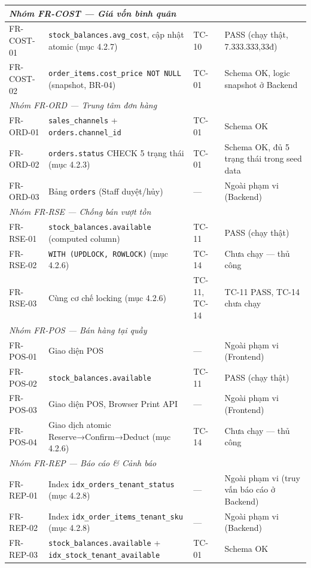 \begin{longtable}{|p{2.1cm}|p{5.2cm}|p{3.3cm}|p{2.6cm}|}
\multicolumn{4}{|l|}{\textit{Nhóm FR-COST — Giá vốn bình quân}} \\ \hline
FR-COST-01 & \texttt{stock\_balances.avg\_cost}, cập nhật atomic (mục 4.2.7) & TC-10 & PASS (chạy thật, 7.333.333,33đ) \\ \hline
FR-COST-02 & \texttt{order\_items.cost\_price NOT NULL} (snapshot, BR-04) & TC-01 & Schema OK, logic snapshot ở Backend \\ \hline

\multicolumn{4}{|l|}{\textit{Nhóm FR-ORD — Trung tâm đơn hàng}} \\ \hline
FR-ORD-01 & \texttt{sales\_channels} + \texttt{orders.channel\_id} & TC-01 & Schema OK \\ \hline
FR-ORD-02 & \texttt{orders.status} CHECK 5 trạng thái (mục 4.2.3) & TC-01 & Schema OK, đủ 5 trạng thái trong seed data \\ \hline
FR-ORD-03 & Bảng \texttt{orders} (Staff duyệt/hủy) & — & Ngoài phạm vi (Backend) \\ \hline

\multicolumn{4}{|l|}{\textit{Nhóm FR-RSE — Chống bán vượt tồn}} \\ \hline
FR-RSE-01 & \texttt{stock\_balances.available} (computed column) & TC-11 & PASS (chạy thật) \\ \hline
FR-RSE-02 & \texttt{WITH (UPDLOCK, ROWLOCK)} (mục 4.2.6) & TC-14 & Chưa chạy — thủ công \\ \hline
FR-RSE-03 & Cùng cơ chế locking (mục 4.2.6) & TC-11, TC-14 & TC-11 PASS, TC-14 chưa chạy \\ \hline

\multicolumn{4}{|l|}{\textit{Nhóm FR-POS — Bán hàng tại quầy}} \\ \hline
FR-POS-01 & Giao diện POS & — & Ngoài phạm vi (Frontend) \\ \hline
FR-POS-02 & \texttt{stock\_balances.available} & TC-11 & PASS (chạy thật) \\ \hline
FR-POS-03 & Giao diện POS, Browser Print API & — & Ngoài phạm vi (Frontend) \\ \hline
FR-POS-04 & Giao dịch atomic Reserve→Confirm→Deduct (mục 4.2.6) & TC-14 & Chưa chạy — thủ công \\ \hline

\multicolumn{4}{|l|}{\textit{Nhóm FR-REP — Báo cáo \& Cảnh báo}} \\ \hline
FR-REP-01 & Index \texttt{idx\_orders\_tenant\_status} (mục 4.2.8) & — & Ngoài phạm vi (truy vấn báo cáo ở Backend) \\ \hline
FR-REP-02 & Index \texttt{idx\_order\_items\_tenant\_sku} (mục 4.2.8) & — & Ngoài phạm vi (Backend) \\ \hline
FR-REP-03 & \texttt{stock\_balances.available} + \texttt{idx\_stock\_tenant\_available} & TC-01 & Schema OK \\ \hline


\end{longtable}
